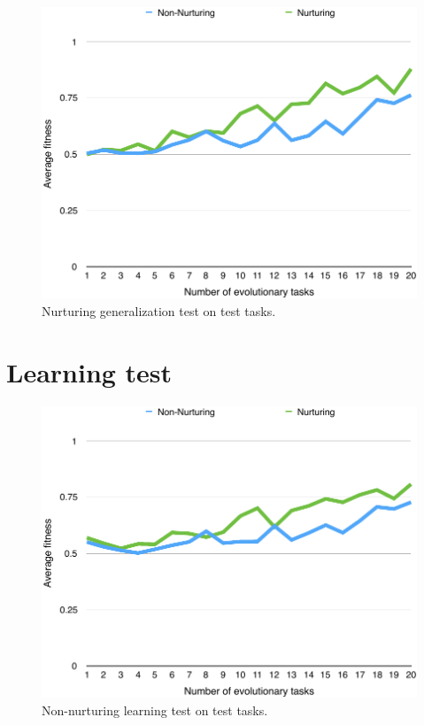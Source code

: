 \documentclass[master]{outhesis}
\begin{document}
\begin{figure}[H]
	\centering
	\includegraphics{NurturingGeneralizationTestPlot.pdf}
	\caption{Nurturing generalization test on test tasks.}
\end{figure}

\section{Learning test}

\begin{figure}[H]
	\centering
	\includegraphics{NonNurturingLearningTestPlot.pdf}
	\caption{Non-nurturing learning test on test tasks.}
\end{figure}
\end{document}
